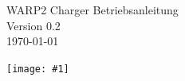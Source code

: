 \documentclass[a4paper,10pt]{article}
\title{}
\author{}
\newcommand{\gfx}[1]{\texttt{[image: \#1]}}
\begin{document}
\pagestyle{empty}
\begin{titlepage}
	\vspace*{-3.08cm}
	\colorbox{boxgray}{}
	\vfill
	\begin{center}
		\Huge
		WARP2 Charger Betriebsanleitung\\\vspace{1cm}
		\large
		Version 0.2\\\vspace{0.25cm}
		\today
	\end{center}
	\vfill \gfx{./img_warp2/resized/warp_perspective_blue_ready}
\end{titlepage}
\newpage
\null
\newpage
\pagestyle{fancy}
\end{document}
